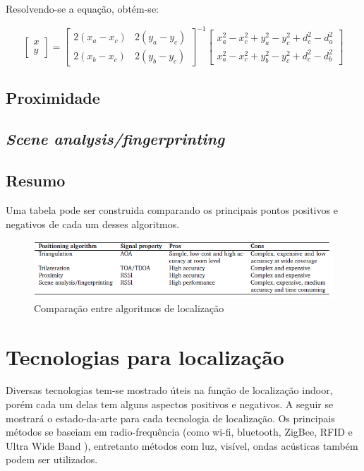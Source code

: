 Resolvendo-se a equação, obtém-se:

\begin{equation*}
\begin{bmatrix} 
	x \\
	y
\end{bmatrix} = 
\begin{bmatrix} 
	2(x_a - x_c) & 2(y_a - y_c) \\
	2(x_b - x_c) & 2(y_b - y_c)
\end{bmatrix}^{-1}
\begin{bmatrix} 
	x_a^2 - x_c^2 + y_a^2 - y_c^2 + d_c^2 - d_a^2 \\
	x_a^2 - x_c^2 + y_b^2 - y_c^2 + d_c^2 - d_b^2
\end{bmatrix}
\end{equation*}


\subsection{Proximidade}
\subsection{\textit{Scene analysis/fingerprinting}}
\subsection{Resumo}

Uma tabela pode ser construida comparando os principais pontos positivos e negativos de cada um desses algoritmos.
\begin{figure}[H]
	\centering 
	\includegraphics[scale = 1]{images/algorithms_table.png}
	\caption{Comparação entre algoritmos de localização \cite{art1}}
	\label{fig:algorithms_table.png}
\end{figure}

\section{Tecnologias para localização}
Diversas tecnologias tem-se mostrado úteis na função de localização indoor, porém cada um delas tem alguns aspectos positivos e negativos. A seguir se mostrará o estado-da-arte para cada tecnologia de localização. Os principais métodos se baseiam em radio-frequência (como wi-fi, bluetooth, ZigBee, RFID e Ultra Wide Band ), entretanto métodos com luz, visível, ondas acústicas também podem ser utilizados.

